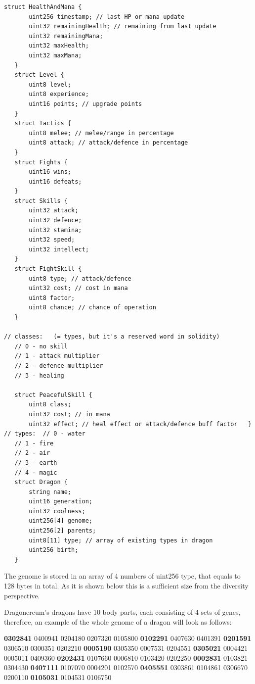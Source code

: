 \documentclass[12pt]{article}
\begin{document}
\begin{footnotesize}
\begin{verbatim}
struct HealthAndMana {
       uint256 timestamp; // last HP or mana update
       uint32 remainingHealth; // remaining from last update
       uint32 remainingMana;
       uint32 maxHealth;
       uint32 maxMana;
   }
   struct Level {
       uint8 level;
       uint8 experience;
       uint16 points; // upgrade points
   }
   struct Tactics {
       uint8 melee; // melee/range in percentage
       uint8 attack; // attack/defence in percentage   
   }
   struct Fights {
       uint16 wins;
       uint16 defeats;
   }
   struct Skills {
       uint32 attack;
       uint32 defence;
       uint32 stamina;
       uint32 speed;
       uint32 intellect;
   }
   struct FightSkill {
       uint8 type; // attack/defence       
       uint32 cost; // cost in mana
       uint8 factor;
       uint8 chance; // chance of operation
   }
   
// classes:   (= types, but it's a reserved word in solidity)
   // 0 - no skill
   // 1 - attack multiplier
   // 2 - defence multiplier
   // 3 - healing

   struct PeacefulSkill {
       uint8 class;
       uint32 cost; // in mana
       uint32 effect; // heal effect or attack/defence buff factor   }
// types:  // 0 - water
   // 1 - fire
   // 2 - air
   // 3 - earth
   // 4 - magic
   struct Dragon {
       string name;
       uint16 generation;
       uint32 coolness;
       uint256[4] genome;
       uint256[2] parents;
       uint8[11] type; // array of existing types in dragon
       uint256 birth;
   }

\end{verbatim}
\end{footnotesize}

The genome is stored in an array of 4 numbers of uint256 type, that equals to 128 bytes in total. As it is shown below this is a sufficient size from the diversity perspective.\par

Dragonereum’s dragons have 10 body parts, each consisting of 4 sets of genes, therefore, an example of the whole genome of a dragon will look as follows:\par

\textbf{0302841} 0400941 0204180 0207320 0105800 \textbf{0102291} 0407630 0401391 \textbf{0201591} 0306510 0300351 0202210 \textbf{0005190} 0305350 0007531 0204551 \textbf{0305021} 0004421 0005011 0409360 \textbf{0202431} 0107660 0006810 0103420 0202250 \textbf{0002831} 0103821 0304430 \textbf{0407111} 0107070 0004201 0102570 \textbf{0405551} 0303861 0104861 0306670 0200110 \textbf{0105031} 0104531 0106750\par
\end{document}
